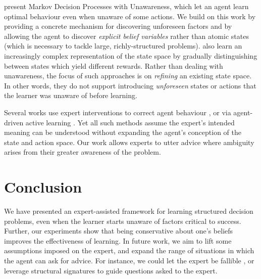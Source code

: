 \documentclass{article}
\begin{document}
	\citet{rong_learning_2016} present Markov Decision Processes with Unawareness, which let an agent learn optimal behaviour even when unaware of some actions. We build on this work by providing a concrete mechanism for discovering unforeseen factors and by allowing the agent to discover \emph{explicit belief variables} rather than atomic states (which is necessary to tackle large, richly-structured problems). \citet{mccallum_reinforcement_1996} also learn an increasingly complex representation of the state space by gradually distinguishing between states which yield different rewards. Rather than dealing with unawareness, the focus of such approaches is on \emph{refining} an existing state space. In other words, they do not support introducing \emph{unforeseen} states or actions that the learner was unaware of before learning.
	
	Several works use expert interventions to correct agent behaviour \cite{torrey_teaching_2013,stone_interactively_2009}, or via agent-driven active learning \cite{masegosa_interactive_2013,murphy_active_2001}. Yet all such methods assume the expert's intended meaning can be understood without expanding the agent's conception of the state and action space. Our work allows experts to utter advice where ambiguity arises from their greater awareness of the problem.
	\section{Conclusion}
	
	We have presented an expert-assisted framework for learning structured decision problems, even when the learner starts unaware of factors critical to success. Further, our experiments show that being conservative about one's beliefs improves the effectiveness of learning. In future work, we aim to lift some assumptions imposed on the expert, and expand the range of situations in which the agent can ask for advice. For instance, we could let the expert be fallible \cite{masegosa_interactive_2013}, or leverage structural signatures \cite{elidan_discovering_2000} to guide questions asked to the expert.
	
	
	
	
	
\end{document}
